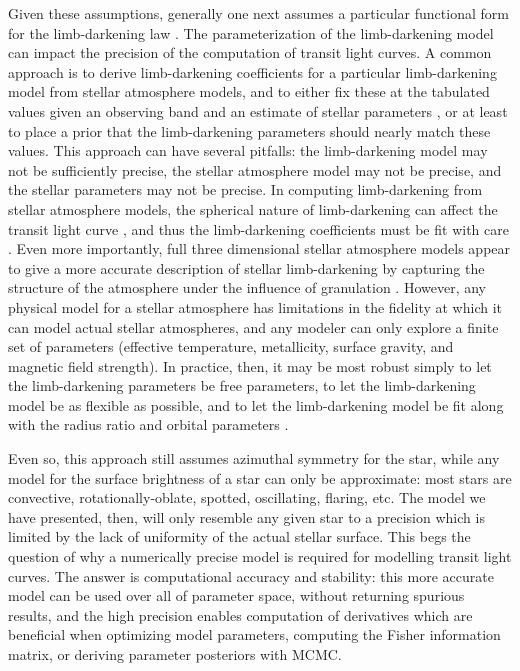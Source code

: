 \documentclass[modern]{aastex61}
\begin{document}
Given these assumptions, generally one next assumes a particular functional
form for the limb-darkening law \citep{Csizmadia2018}.  The parameterization of 
the limb-darkening model can impact the precision of the computation
of transit light curves.  A common approach is to derive limb-darkening
coefficients for a particular limb-darkening model from stellar atmosphere models, 
and to either fix these at the tabulated values given an observing band and an 
estimate of stellar parameters \citep{Claret2011,Howarth2011}, or at least to place 
a prior that the limb-darkening parameters should nearly match these values.
This approach can have several pitfalls:  the limb-darkening model may not be
sufficiently precise,  the stellar atmosphere model may not be precise, and
the stellar parameters may not be precise.
In computing limb-darkening from stellar atmosphere models, 
the spherical nature of limb-darkening can affect the transit light curve
\citep{Neilson2013,Neilson2017}, and thus the limb-darkening coefficients must be fit
with care \citep{Claret2018}.  Even more importantly, full three dimensional
stellar atmosphere models appear to give a more accurate description of
stellar limb-darkening by capturing the structure of the atmosphere under
the influence of granulation \citep{Hayek2012,Magic2015}.  However, any
physical model for a stellar atmosphere has limitations in the fidelity at
which it can model actual stellar atmospheres,
and any modeler can only explore a finite set of parameters (effective temperature,
metallicity, surface gravity, and magnetic field strength).
In practice, then, it may be most robust simply to let the limb-darkening parameters 
be free parameters, to let the limb-darkening model be as flexible as possible, 
and to let the limb-darkening model be fit along with the radius ratio and
orbital parameters \citep{Csizmadia2012,Espinoza2015}.

Even so, this approach still assumes azimuthal symmetry for the star, while 
any model for the surface brightness of a star can only be approximate:
most stars are convective, rotationally-oblate, spotted, oscillating, flaring,
etc.  The model we have presented, then, will only resemble any given star to
a precision which is limited by the lack of uniformity of the actual stellar
surface.  This begs the question of why a numerically precise model is required
for modelling transit light curves.  The answer is computational accuracy
and stability: this more accurate model can be used over all of parameter space,
without returning spurious results, and the high precision enables computation 
of derivatives which are beneficial when optimizing model parameters, computing 
the Fisher information matrix, or deriving parameter posteriors with MCMC.
\end{document}
